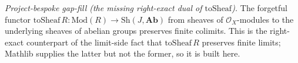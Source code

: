 \begin{lemma}
  \label{mk-lem:toSheaf_preservesFiniteColimits}
  \leanok
  \textit{Project-bespoke gap-fill (the missing right-exact dual of \(\mathrm{toSheaf}\)).}
  The forgetful functor \(\mathrm{toSheaf}\,R : \mathrm{Mod}(R) \to \mathrm{Sh}(J, \mathbf{Ab})\)
  from sheaves of \(\mathcal{O}_X\)-modules to the underlying sheaves of abelian groups preserves
  finite colimits. This is the right-exact counterpart of the limit-side fact that
  \(\mathrm{toSheaf}\,R\) preserves finite limits; Mathlib supplies the latter but not the former, so
  it is built here.
\end{lemma}
